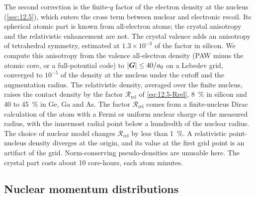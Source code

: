 The second correction is the finite-$q$ factor of the electron density at the nucleus (\cref{sec:12.5}), which enters the cross term between nuclear and electronic recoil. Its spherical atomic part is known from all-electron atoms; the crystal anisotropy and the relativistic enhancement are not. The crystal valence adds an anisotropy of tetrahedral symmetry, estimated at $1.3\times10^{-3}$ of the factor in silicon. We compute this anisotropy from the valence all-electron density (PAW minus the atomic core, or a full-potential code) to $|\bm{G}| \le 40/a_0$ on a Lebedev grid, converged to $10^{-5}$ of the density at the nucleus under the cutoff and the augmentation radius. The relativistic density, averaged over the finite nucleus, raises the contact density by the factor $\mathcal{R}_{\mathrm{rel}}$ of \cref{eq:12.5-Rrel}, \SI{8}{\percent} in silicon and 40 to \SI{45}{\percent} in Ge, Ga and As. The factor $\mathcal{R}_{\mathrm{rel}}$ comes from a finite-nucleus Dirac calculation of the atom with a Fermi or uniform nuclear charge of the measured radius, with the innermost radial point below a hundredth of the nuclear radius. The choice of nuclear model changes $\mathcal{R}_{\mathrm{rel}}$ by less than \SI{1}{\percent}. A relativistic point-nucleus density diverges at the origin, and its value at the first grid point is an artifact of the grid. Norm-conserving pseudo-densities are unusable here. The crystal part costs about 10 core-hours, each atom minutes.

\subsection{Nuclear momentum distributions}

